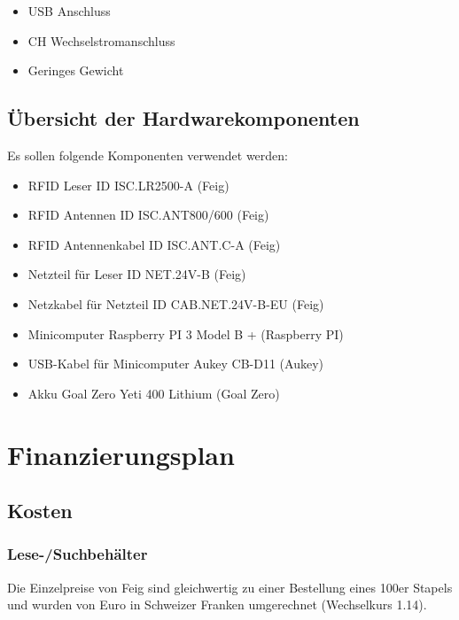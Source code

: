 \begin{itemize}
	\item USB Anschluss
	\item CH Wechselstromanschluss
	\item Geringes Gewicht
\end{itemize}

\subsection{Übersicht der Hardwarekomponenten}
Es sollen folgende Komponenten verwendet werden:

\begin{itemize}
	\item RFID Leser ID ISC.LR2500-A  (Feig)
	\item RFID Antennen ID ISC.ANT800/600 (Feig)
	\item RFID Antennenkabel ID ISC.ANT.C-A (Feig)
	\item Netzteil für Leser ID NET.24V-B (Feig)
	\item Netzkabel für Netzteil ID CAB.NET.24V-B-EU  (Feig)
	\item Minicomputer Raspberry PI 3 Model B + (Raspberry PI)
	\item USB-Kabel für Minicomputer Aukey CB-D11 (Aukey)
	\item Akku Goal Zero Yeti 400 Lithium (Goal Zero)
\end{itemize}

\section{Finanzierungsplan}

\subsection{Kosten}

\subsubsection{Lese-/Suchbehälter}
Die Einzelpreise von Feig sind gleichwertig zu einer Bestellung eines 100er Stapels und wurden von Euro in Schweizer Franken umgerechnet (Wechselkurs 1.14).


